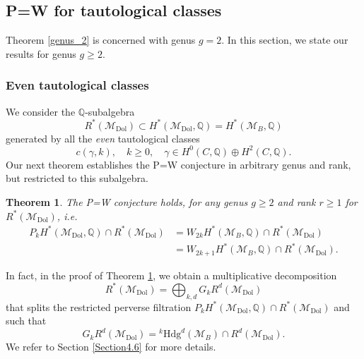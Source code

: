 \documentclass[11pt]{amsart}
\theoremstyle{plain}
\newtheorem{thm}{Theorem}[section]
\theoremstyle{definition}
\theoremstyle{remark}
\newcommand{\BQ}{{\mathbb{Q}}}
\newcommand{\CM}{{\mathcal M}}
\begin{document}
\subsection{P=W for tautological classes}
Theorem \ref{genus_2} is concerned with genus $g=2$.
In this section, we state our results for genus $g \geq  2$.
\subsubsection{Even tautological classes}
We consider the $\BQ$-subalgebra
\[
R^*(\CM_{\mathrm{Dol}})  \subset H^*(\CM_{\mathrm{Dol}}, \BQ)= H^*(\CM_B, \BQ)
\]
generated by all the \emph{even} tautological classes
\[
c(\gamma,k), \quad  k\geq 0, \quad  \gamma \in H^0(C, \BQ)\oplus H^2(C, \BQ).
\]
Our next theorem establishes the P=W conjecture in arbitrary genus and rank, but restricted to this subalgebra.
\begin{thm}\label{P=W_even}
The P=W conjecture holds, for any genus $g \geq 2$ and rank $r\geq 1$ for $R^*(\CM_{\mathrm{Dol}})$, \emph{i.e.}
\[
\begin{split}
P_kH^\ast(\CM_{\mathrm{Dol}}, \BQ) \cap R^*(\CM_{\mathrm{Dol}}) & = W_{2k}H^\ast(\CM_{B}, \BQ) \cap R^*(\CM_{\mathrm{Dol}})\\
& = W_{2k+1}H^\ast(\CM_{B}, \BQ) \cap R^*(\CM_{\mathrm{Dol}}).
\end{split}
\]
\end{thm}

In fact, in the proof of Theorem  \ref{P=W_even}, we obtain a multiplicative decomposition 
\begin{equation*}
R^*(\CM_{\mathrm{Dol}}) = \bigoplus_{k,d} G_k R^d(\CM_{\mathrm{Dol}})
\end{equation*}
 that splits the restricted perverse filtration $P_kH^\ast(\CM_{\mathrm{Dol}}, \BQ) \cap R^*(\CM_{\mathrm{Dol}})$ and such that 
\[
G_k R^d(\CM_{\mathrm{Dol}}) =  {^k\mathrm{Hdg}^d}(\CM_B) \cap R^{d}(\CM_{\mathrm{Dol}}).
\]
We refer to Section \ref{Section4.6} for more details.

\end{document}
